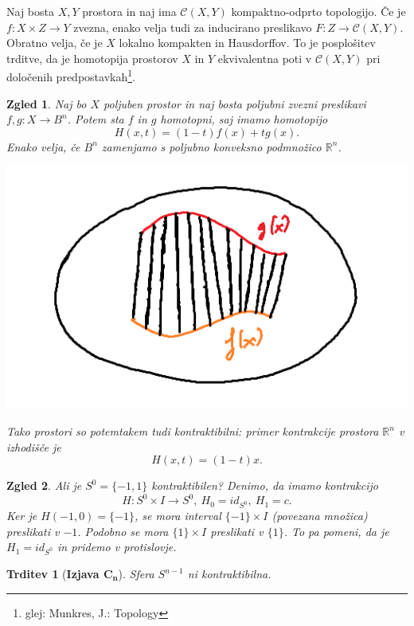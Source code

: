 \documentclass[10pt, a4paper]{article}
\newtheorem{trditev}[izr]{Trditev}
\newtheorem{zgled}{Zgled}[section]
\newcommand{\R}{\mathbb {R}}
\begin{document}
  Naj bosta $X, Y$ prostora in naj ima $\mathcal{C} (X, Y)$ kompaktno-odprto topologijo.
  Če je $f: X \times Z \to Y$ zvezna, enako velja tudi za inducirano preslikavo $F: Z \to \mathcal{C} (X, Y)$.
  Obratno velja, če je $X$ lokalno kompakten in Hausdorffov. To je posplošitev trditve,
  da je homotopija prostorov $X$ in $Y$ ekvivalentna poti v $\mathcal{C}(X, Y)$ pri določenih predpostavkah\footnote[2]{glej: Munkres, J.: Topology}.

\begin{zgled}
  Naj bo $X$ poljuben prostor in naj bosta poljubni zvezni preslikavi $f, g : X \to B^n$.
  Potem sta $f$ in $g$ homotopni, saj imamo homotopijo $$H(x, t) = (1 - t) f(x) + t g(x).$$
  Enako velja, če $B^n$ zamenjamo s poljubno konveksno podmnožico $\R^n$.
  \begin{center}
    \includegraphics[scale=0.7]{zgled7.png}
  \end{center}  
  Tako prostori so potemtakem tudi kontraktibilni: primer kontrakcije prostora $\R^n$ v izhodišče je 
  $$H(x, t) = (1 - t)x.$$
\end{zgled}

\begin{zgled}
  Ali je $S^0 = \{-1, 1\}$ kontraktibilen? Denimo, da imamo kontrakcijo 
  $$H: S^0 \times I \to S^0,\ H_0 = id_{S^0},\ H_1 = c.$$
  Ker je $H(-1, 0) = \{-1\}$, se mora interval $\{-1\} \times I$ (povezana množica)
  preslikati v $-1$. Podobno se mora $\{1\} \times I$ preslikati v $\{1\}$.
  To pa pomeni, da je $H_1 = id_{S^0}$ in pridemo v protislovje.
\end{zgled}

\begin{trditev}[\textbf{Izjava $\mathbf{C_n}$}]
  Sfera $S^{n - 1}$ ni kontraktibilna.
\end{trditev}
\end{document}
